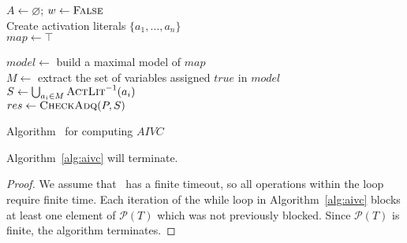 \begin{algorithm}[t]
  \BlankLine
  $A \leftarrow \varnothing$; $w \leftarrow \textsc{False}$ \\
  Create activation literals $\{a_1, \ldots, a_n\}$ \\
  $map \leftarrow \top$ \\
  \BlankLine

   { \label{alg:aivc:checksat}
    $model \leftarrow $ build a maximal model of $map$  \label{alg:aivc:maxsat} \\
    $M \leftarrow$ extract the set of variables assigned $true$ in $model$ \label{alg:aivc:assignm}\\
    $S \leftarrow \bigcup_{a_i \in M} \textsc{ActLit} ^{-1}(a_i)$ \label{alg:aivc:assigns}\\
    $res \leftarrow \textsc{CheckAdq} (P, S)$ \\
  }
\caption{Algorithm \aivcalg ~for computing $AIVC$}
\label{alg:aivc}
\end{algorithm}


\begin{theorem}
\label{theorem:termination}
  Algorithm~\ref{alg:aivc} will terminate.
\end{theorem}
\begin{proof}
We assume that \isadeq\ has a finite timeout, so all operations within the
loop require finite time.  Each iteration of the while loop in Algorithm~\ref{alg:aivc} blocks at least one element of $\mathcal{P}(T)$ which was not previously
blocked. Since $\mathcal{P}(T)$ is finite, the algorithm terminates.
\end{proof}

